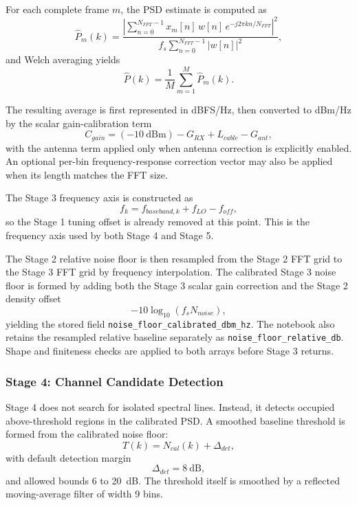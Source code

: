 \documentclass[11pt]{article}
\begin{document}
For each complete frame $m$, the PSD estimate is computed as
\begin{equation}
\hat{P}_m(k) = \frac{\left| \sum_{n=0}^{N_{FFT}-1} x_m[n]\, w[n]\, e^{-j2\pi k n / N_{FFT}} \right|^2}{f_s \sum_{n=0}^{N_{FFT}-1} |w[n]|^2},
\end{equation}
and Welch averaging yields
\begin{equation}
\hat{P}(k) = \frac{1}{M} \sum_{m=1}^{M} \hat{P}_m(k).
\end{equation}

The resulting average is first represented in dBFS/Hz, then converted to dBm/Hz by the scalar gain-calibration term
\begin{equation}
C_{gain} = (-10~\text{dBm}) - G_{RX} + L_{cable} - G_{ant},
\end{equation}
with the antenna term applied only when antenna correction is explicitly enabled. An optional per-bin frequency-response correction vector may also be applied when its length matches the FFT size.

The Stage 3 frequency axis is constructed as
\begin{equation}
f_k = f_{baseband,k} + f_{LO} - f_{off},
\end{equation}
so the Stage 1 tuning offset is already removed at this point. This is the frequency axis used by both Stage 4 and Stage 5.

The Stage 2 relative noise floor is then resampled from the Stage 2 FFT grid to the Stage 3 FFT grid by frequency interpolation. The calibrated Stage 3 noise floor is formed by adding both the Stage 3 scalar gain correction and the Stage 2 density offset
\begin{equation}
-10 \log_{10}(f_s N_{noise}),
\end{equation}
yielding the stored field \texttt{noise\_floor\_calibrated\_dbm\_hz}. The notebook also retains the resampled relative baseline separately as \texttt{noise\_floor\_relative\_db}. Shape and finiteness checks are applied to both arrays before Stage 3 returns.

\subsubsection*{Stage 4: Channel Candidate Detection}

Stage 4 does not search for isolated spectral lines. Instead, it detects occupied above-threshold regions in the calibrated PSD. A smoothed baseline threshold is formed from the calibrated noise floor:
\begin{equation}
T(k) = N_{cal}(k) + \Delta_{det},
\end{equation}
with default detection margin
\begin{equation}
\Delta_{det} = 8~\text{dB},
\end{equation}
and allowed bounds 6 to 20~dB. The threshold itself is smoothed by a reflected moving-average filter of width 9 bins.
\end{document}
